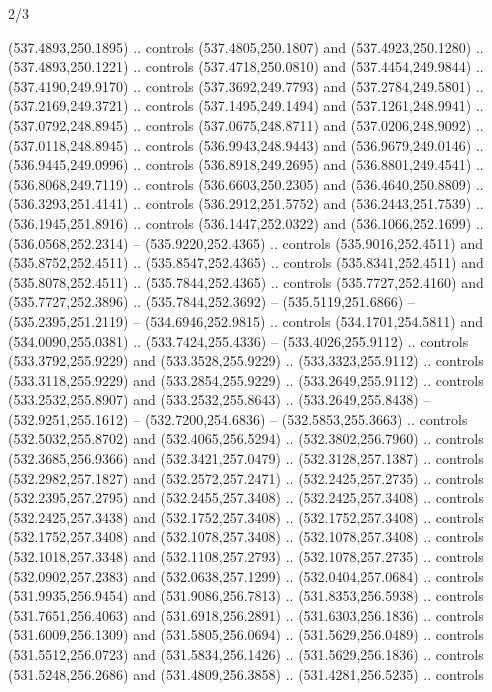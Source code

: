 \begin{flagdescription}{2/3}
\begin{scope}[xshift=0.5\flaglength,yshift=0.5\flagwidth,scale=\flagwidth/495.65]
\begin{scope}[y=0.8pt, x=0.8pt, yscale=-1,shift={(-463.76,-309.78)}]
  (537.4893,250.1895) .. controls (537.4805,250.1807) and (537.4923,250.1280) ..
  (537.4893,250.1221) .. controls (537.4718,250.0810) and (537.4454,249.9844) ..
  (537.4190,249.9170) .. controls (537.3692,249.7793) and (537.2784,249.5801) ..
  (537.2169,249.3721) .. controls (537.1495,249.1494) and (537.1261,248.9941) ..
  (537.0792,248.8945) .. controls (537.0675,248.8711) and (537.0206,248.9092) ..
  (537.0118,248.8945) .. controls (536.9943,248.9443) and (536.9679,249.0146) ..
  (536.9445,249.0996) .. controls (536.8918,249.2695) and (536.8801,249.4541) ..
  (536.8068,249.7119) .. controls (536.6603,250.2305) and (536.4640,250.8809) ..
  (536.3293,251.4141) .. controls (536.2912,251.5752) and (536.2443,251.7539) ..
  (536.1945,251.8916) .. controls (536.1447,252.0322) and (536.1066,252.1699) ..
  (536.0568,252.2314) -- (535.9220,252.4365) .. controls (535.9016,252.4511) and
  (535.8752,252.4511) .. (535.8547,252.4365) .. controls (535.8341,252.4511) and
  (535.8078,252.4511) .. (535.7844,252.4365) .. controls (535.7727,252.4160) and
  (535.7727,252.3896) .. (535.7844,252.3692) -- (535.5119,251.6866) --
  (535.2395,251.2119) -- (534.6946,252.9815) .. controls (534.1701,254.5811) and
  (534.0090,255.0381) .. (533.7424,255.4336) -- (533.4026,255.9112) .. controls
  (533.3792,255.9229) and (533.3528,255.9229) .. (533.3323,255.9112) .. controls
  (533.3118,255.9229) and (533.2854,255.9229) .. (533.2649,255.9112) .. controls
  (533.2532,255.8907) and (533.2532,255.8643) .. (533.2649,255.8438) --
  (532.9251,255.1612) -- (532.7200,254.6836) -- (532.5853,255.3663) .. controls
  (532.5032,255.8702) and (532.4065,256.5294) .. (532.3802,256.7960) .. controls
  (532.3685,256.9366) and (532.3421,257.0479) .. (532.3128,257.1387) .. controls
  (532.2982,257.1827) and (532.2572,257.2471) .. (532.2425,257.2735) .. controls
  (532.2395,257.2795) and (532.2455,257.3408) .. (532.2425,257.3408) .. controls
  (532.2425,257.3438) and (532.1752,257.3408) .. (532.1752,257.3408) .. controls
  (532.1752,257.3408) and (532.1078,257.3408) .. (532.1078,257.3408) .. controls
  (532.1018,257.3348) and (532.1108,257.2793) .. (532.1078,257.2735) .. controls
  (532.0902,257.2383) and (532.0638,257.1299) .. (532.0404,257.0684) .. controls
  (531.9935,256.9454) and (531.9086,256.7813) .. (531.8353,256.5938) .. controls
  (531.7651,256.4063) and (531.6918,256.2891) .. (531.6303,256.1836) .. controls
  (531.6009,256.1309) and (531.5805,256.0694) .. (531.5629,256.0489) .. controls
  (531.5512,256.0723) and (531.5834,256.1426) .. (531.5629,256.1836) .. controls
  (531.5248,256.2686) and (531.4809,256.3858) .. (531.4281,256.5235) .. controls

\end{scope}
\end{scope}
\end{flagdescription}
